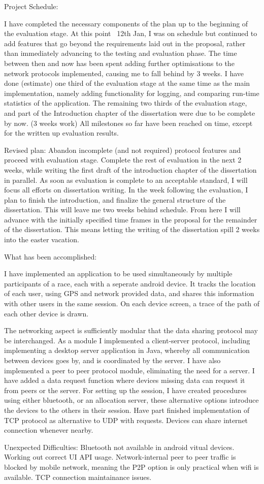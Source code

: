 \documentclass{article}
\begin{document}
Project Schedule:

I have completed the necessary components of the plan up to the beginning of the evaluation stage.
At this point ~12th Jan, I was on schedule but continued to add features that go beyond the requirements laid out in the proposal, rather than immediately advancing to the testing and evaluation phase. The time between then and now has been spent adding further optimisations to the network protocols implemented, causing me to fall behind by 3 weeks.
I have done (estimate) one third of the evaluation stage at the same time as the main implementation, namely adding functionality for logging, and comparing run-time statistics of the application. The remaining two thirds of the evaluation stage, and part of the Introduction chapter of the dissertation were due to be complete by now. (3 weeks work)
All milestones so far have been reached on time, except for the written up evaluation results.

Revised plan:
Abandon incomplete (and not required) protocol features and proceed with evaluation stage.
Complete the rest of evaluation in the next 2 weeks, while writing the first draft of the introduction chapter of the dissertation in parallel.
As soon as evaluation is complete to an acceptable standard, I will focus all efforts on dissertation writing.
In the week following the evaluation, I plan to finish the introduction, and finalize the general structure of the dissertation.
This will leave me two weeks behind schedule.
From here I will advance with the initially specified time frames in the proposal for the remainder of the dissertation. This means letting the writing of the dissertation spill 2 weeks into the easter vacation.

What has been accomplished:

I have implemented an application to be used simultaneously by multiple participants of a race, each with a seperate android device. It tracks the location of each user, using GPS and network provided data, and shares this information with other users in the same session. On each device screen, a trace of the path of each other device is drawn.

The networking aspect is sufficiently modular that the data sharing protocol may be interchanged. As a module I implemented a client-server protocol, including implementing a desktop server application in Java, whereby all communication between devices goes by, and is coordinated by the server.
I have also implemented a peer to peer protocol module, eliminating the need for a server.
I have added a data request function where devices missing data can request it from peers or the server.
For setting up the session, I have created procedures using either bluetooth, or an allocation server, these alternative options introduce the devices to the others in their session.
Have part finished implementation of TCP protocol as alternative to UDP with requests.
Devices can share internet connection whenever nearby.

Unexpected Difficulties:
Bluetooth not available in android vitual devices.
Working out correct UI API usage.
Network-internal peer to peer traffic is blocked by mobile network, meaning the P2P option is only practical when wifi is available.
TCP connection maintainance issues.
\end{document}

